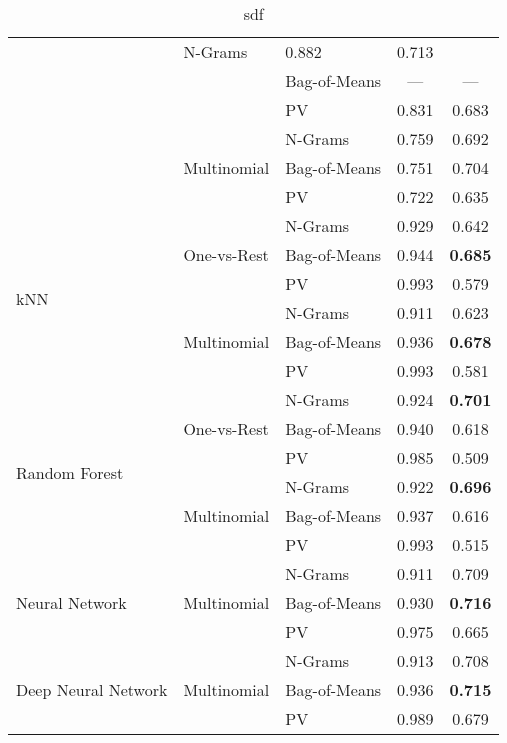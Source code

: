 \begin{table}[h]
\begin{center}
\begin{tabular}{ lll cc }
         & N-Grams & 0.882 & 0.713 \\
       & & Bag-of-Means & --- & --- \\
       & & PV & 0.831 & 0.683 \\
       \cmidrule(r){2-5}
       & \multirow{3}{*}{Multinomial}
         & N-Grams & 0.759 & 0.692 \\
       & & Bag-of-Means & 0.751 & 0.704 \\
       & & PV & 0.722 & 0.635 \\
      \midrule
      \multirow{6}{*}{kNN}
      & \multirow{3}{*}{One-vs-Rest}
      & N-Grams & 0.929 & 0.642 \\
      & & Bag-of-Means & 0.944 & \textbf{0.685} \\
      & & PV & 0.993 & 0.579 \\
      \cmidrule(r){2-5}
      & \multirow{3}{*}{Multinomial}
      & N-Grams & 0.911 & 0.623 \\
      & & Bag-of-Means & 0.936 & \textbf{0.678} \\
      & & PV & 0.993 & 0.581 \\
      \midrule
      \multirow{6}{*}{Random Forest}
      & \multirow{3}{*}{One-vs-Rest}
      & N-Grams & 0.924 & \textbf{0.701} \\
      & & Bag-of-Means & 0.940 & 0.618 \\
      & & PV & 0.985 & 0.509 \\
      \cmidrule(r){2-5}
      & \multirow{3}{*}{Multinomial}
      & N-Grams & 0.922 & \textbf{0.696} \\
      & & Bag-of-Means & 0.937 & 0.616 \\
      & & PV & 0.993 & 0.515 \\
      \midrule
      \multirow{3}{*}{Neural Network}
      & \multirow{3}{*}{Multinomial}
      & N-Grams & 0.911 & 0.709 \\
      & & Bag-of-Means & 0.930 & \textbf{0.716} \\
      & & PV & 0.975 & 0.665 \\
      \midrule
      \multirow{3}{*}{Deep Neural Network}
      & \multirow{3}{*}{Multinomial}
      & N-Grams & 0.913 & 0.708 \\
      & & Bag-of-Means & 0.936 & \textbf{0.715} \\
      & & PV & 0.989 & 0.679 \\
      \bottomrule
    \end{tabular}
  \caption{sdf}
\label{tab:Paragraph Vector Parameter Hyper-Parameter Results Full}
\end{center}
\end{table}

